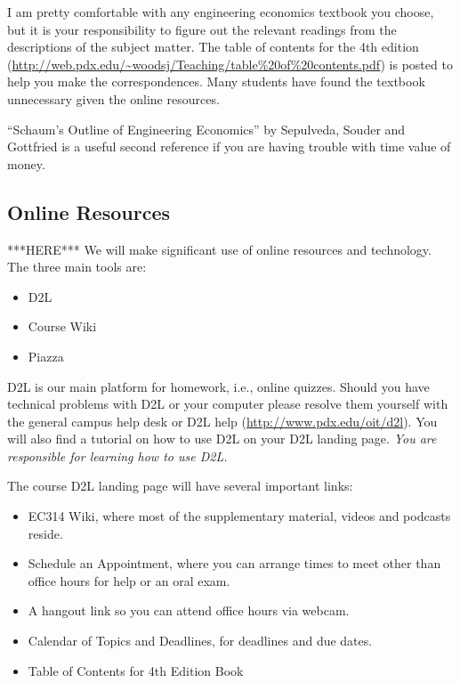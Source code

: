 \documentclass[letterpaper,10pt]{article}
\newif\ifonline
\begin{document}
I am pretty comfortable with any engineering
economics textbook you choose, but it is your responsibility to figure
out the relevant readings from the descriptions of the subject matter.
The table of contents for the 4th edition (\url{http://web.pdx.edu/~woodsj/Teaching/table\%20of\%20contents.pdf}) is posted to help you
make the correspondences.  Many students have found the textbook unnecessary given the online resources.

``Schaum's Outline of Engineering Economics'' by Sepulveda, Souder and Gottfried is a useful second reference if you are having trouble with time value of money.

\subsection{Online Resources} ***HERE***
We will make significant use of online resources and technology.  The
three main tools are:
\begin{itemize}
\item D2L
\item Course Wiki
\item Piazza
\end{itemize}

D2L is our main platform for homework, i.e., online quizzes.  Should you have technical problems with D2L
or your computer please resolve them yourself with the general campus
help desk or D2L help (\url{http://www.pdx.edu/oit/d2l}).  You will
also find a tutorial on how to use D2L on your D2L landing page.
\emph{You are responsible for learning how to use D2L.}


The course D2L landing page will have several important links:
\begin{itemize}
  \item EC314 Wiki, where most of the supplementary material, videos and
    podcasts reside.
  \ifonline
    \item Schedule an Appointment, where you can arrange times to meet
    other than office hours for help.
    \else
    \item Schedule an Appointment, where you can arrange times to meet
    other than office hours for help or an oral exam.  
  \fi
  
  \item A hangout link so you can attend office hours via webcam.
  \item Calendar of Topics and Deadlines, for deadlines and due dates.
  \item Table of Contents for 4th Edition Book
\end{itemize}
\end{document}

